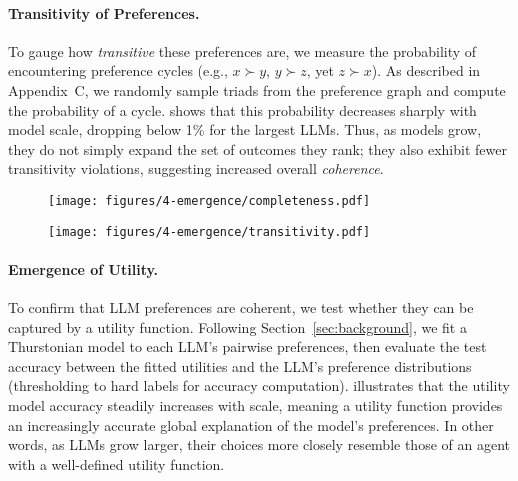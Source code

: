 \paragraph{Transitivity of Preferences.}
To gauge how \emph{transitive} these preferences are, we measure the probability of encountering preference cycles (e.g., \(x \succ y\), \(y \succ z\), yet \(z \succ x\)). As described in Appendix~C, we randomly sample triads from the preference graph and compute the probability of a cycle.  shows that this probability decreases sharply with model scale, dropping below 1\% for the largest LLMs. Thus, as models grow, they do not simply expand the set of outcomes they rank; they also exhibit fewer transitivity violations, suggesting increased overall \emph{coherence}.


\begin{figure}[t]
    \centering
    \begin{minipage}{0.49\textwidth}
        \centering
        \texttt{[image: figures/4-emergence/completeness.pdf]}
        \label{fig:completeness}
    \end{minipage}\hfill
    \begin{minipage}{0.49\textwidth}
        \centering
        \texttt{[image: figures/4-emergence/transitivity.pdf]}
        \label{fig:transitivity}
    \end{minipage}
    \vspace{-10pt}
\end{figure}

\paragraph{Emergence of Utility.}
To confirm that LLM preferences are coherent, we test whether they can be captured by a utility function. Following Section~\ref{sec:background}, we fit a Thurstonian model to each LLM’s pairwise preferences, then evaluate the test accuracy between the fitted utilities and the LLM’s preference distributions (thresholding to hard labels for accuracy computation).  illustrates that the utility model accuracy steadily increases with scale, meaning a utility function provides an increasingly accurate global explanation of the model’s preferences. In other words, as LLMs grow larger, their choices more closely resemble those of an agent with a well-defined utility function.

